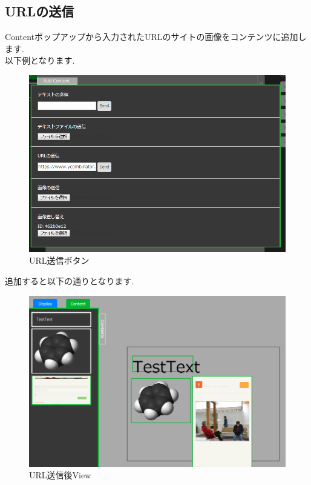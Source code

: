 \documentclass[a4paper,10pt,oneside]{jsbook}
\begin{document}
\newpage



\subsection{URLの送信}
Contentポップアップから入力されたURLのサイトの画像をコンテンツに追加します.\\
以下例となります.\\
\begin{figure}[htbp]
	\begin{center}
		\includegraphics[width=12.5cm]{image/AddContent_URL.PNG}

	\end{center}
	\caption{URL送信ボタン}
	\label{fig:home}
\end{figure}

追加すると以下の通りとなります.\\


\begin{figure}[htbp]
	\begin{center}
		\includegraphics[width=12.5cm]{image/AddContent_URL_View.PNG}
	\end{center}
	\caption{URL送信後View}
	\label{fig:sendurl}
\end{figure}
\end{document}
